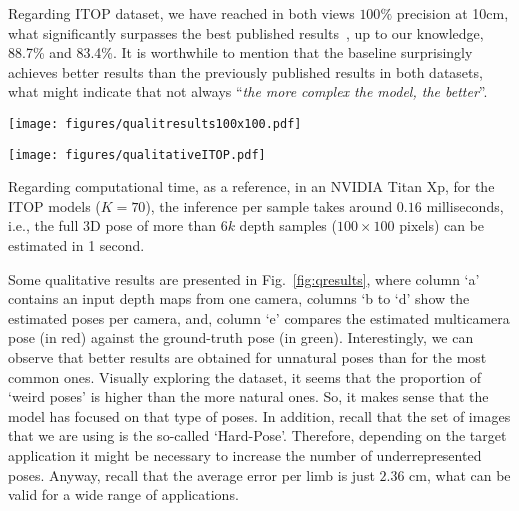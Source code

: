 \documentclass[review,12pt,3p]{elsarticle}
\begin{document}
Regarding ITOP dataset, we have reached in both views $100\%$ precision at 10cm, what significantly surpasses the best published results~\cite{moon2018cvpr}, up to our knowledge, 88.7\% and 83.4\%.
It is worthwhile to mention that the baseline surprisingly achieves better results than the previously published results in both datasets, what might indicate that not always ``\textit{the more complex the model, the better}''.


\begin{figure*}[p]
\centering
   \texttt{[image: figures/qualitresults100x100.pdf]}
   \caption{\textbf{Qualitative results on UBC3V}.
   \textbf{Top block}: successful cases (green rectangle). \textbf{Bottom block}: failure cases (red rectangle). Columns: (a) depth map from one camera; (b) Camera 1; (c) Camera 2; (d) Camera 3; (e) Multicamera pose (red) vs ground-truth (green). 
   Best viewed in color.
   }
   \label{fig:qresults}
\end{figure*}

\begin{figure*}[p]
\centering
   \texttt{[image: figures/qualitativeITOP.pdf]}
   \caption{\textbf{Qualitative results on ITOP}.
   \textbf{Left block}: cases with low error. \textbf{Right block}: cases with higher error. Columns (from left to right): frontal  viewpoint depth map; top viewpoint depth map; and, estimated pose (blue) vs ground-truth (green). 
   Best viewed in digital format (zoom-in to find the  ``errorneous'' estimations).
   }
   \label{fig:qresultsITOP}
\end{figure*}

Regarding computational time, as a reference, in an  NVIDIA Titan Xp, for the ITOP models ($K=70$), the inference per sample takes around $0.16$ milliseconds, i.e., the full 3D pose of more than 6$k$ depth samples ($100\times100$ pixels) can be estimated in 1 second.


Some qualitative results are presented in Fig.~\ref{fig:qresults}, where column `a' contains an input depth maps from one camera, columns `b to `d' show the estimated poses per camera, and, column `e' compares the estimated multicamera pose (in red) against the ground-truth pose (in green).
Interestingly, we can observe that better results are obtained for unnatural poses than for the most common ones. Visually exploring the dataset, it seems that the proportion of `weird poses' is higher than the more natural ones. So, it makes sense that the model has focused on that type of poses. In addition, recall that the set of images that we are using is the so-called `Hard-Pose'. Therefore, depending on the target application it might be necessary to increase the number of underrepresented poses. Anyway, recall that the average error per limb is just $2.36$ cm, what can be valid for a wide range of applications.
\end{document}
